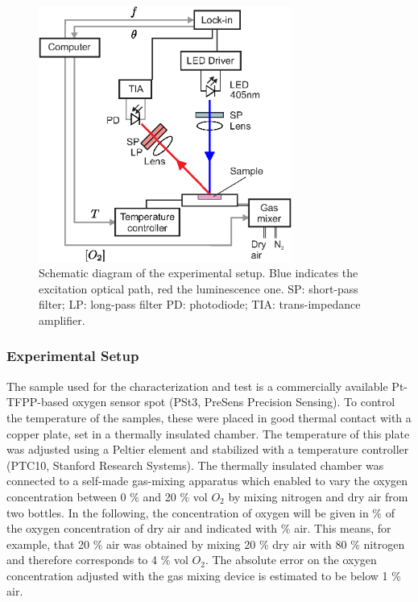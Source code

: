 \documentclass[9pt,twocolumn,twoside,pdftex]{optica}
\begin{document}
\begin{figure}[t!]
\centering
\includegraphics[keepaspectratio, width=8.3cm]{Setup_auto.eps}
\caption{Schematic diagram of the experimental setup. Blue indicates the excitation optical path, red the luminescence one. SP: short-pass filter; LP: long-pass filter PD: photodiode; TIA: trans-impedance amplifier.}
\label{fig:setup}
\end{figure}


\subsubsection{Experimental Setup}

The sample used for the characterization and test is a commercially available Pt-TFPP-based oxygen sensor spot (PSt3, PreSens Precision Sensing).
To control the temperature of the samples, these were placed in good thermal contact with a copper plate, set in a thermally insulated chamber. The temperature of this plate was adjusted using a Peltier element and stabilized with a temperature controller (PTC10, Stanford Research Systems). The thermally insulated chamber was connected to a self-made gas-mixing apparatus which enabled to vary the oxygen concentration between 0 $\%$ and 20 $\%$ vol $O_2$ by mixing nitrogen and dry air from two bottles. In the following, the concentration of oxygen will be given in $\%$ of the oxygen concentration of dry air and indicated with $\%$ air. This means, for example, that 20 $\%$ air was obtained by mixing 20 $\%$ dry air with 80 $\%$ nitrogen and therefore corresponds to 4 $\%$ vol $O_2$. The absolute error on the oxygen concentration adjusted with the gas mixing device is estimated to be below 1 $\%$ air. 
 
\end{document}
